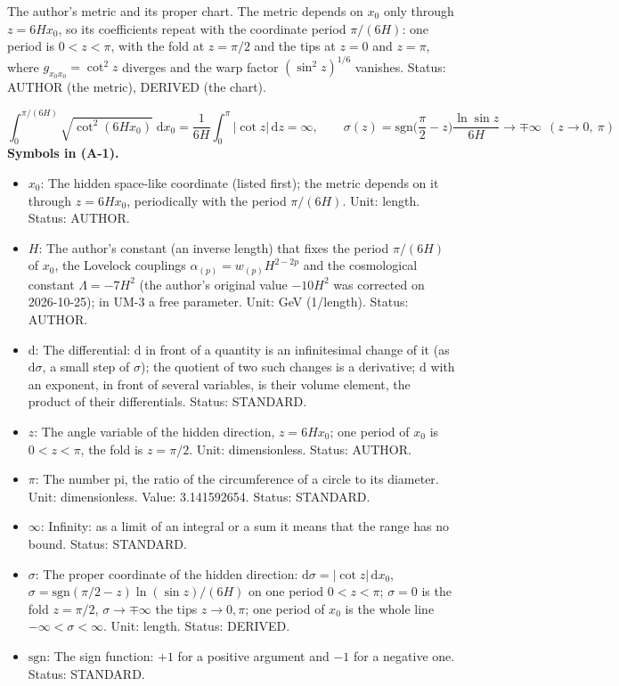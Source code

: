 \documentclass[
  10pt,
]{article}
\providecommand{\tightlist}{%
  \setlength{\itemsep}{0pt}\setlength{\parskip}{0pt}}
\begin{document}
The author's metric and its proper chart. The metric depends on \(x_0\)
only through \(z = 6Hx_0\), so its coefficients repeat with the
coordinate period \(\pi/(6H)\): one period is \(0 < z < \pi\), with the
fold at \(z = \pi/2\) and the tips at \(z = 0\) and \(z = \pi\), where
\(g_{x_0x_0} = \cot^2z\) diverges and the warp factor
\((\sin^2z)^{1/6}\) vanishes. Status: AUTHOR (the metric), DERIVED (the
chart).

\[
\int_0^{\pi/(6H)}\sqrt{\cot^2(6Hx_0)}\;\mathrm{d}x_0 = \frac{1}{6H}\int_0^{\pi}\lvert\cot z\rvert\,\mathrm{d}z = \infty,\qquad
\sigma(z) = \mathrm{sgn}\Big(\frac{\pi}{2} - z\Big)\frac{\ln\sin z}{6H} \to \mp\infty\ \ (z \to 0,\ \pi) \tag{A-1}
\] \textbf{Symbols in (A-1).}

\begin{itemize}
\tightlist
\item
  \(x_0\): The hidden space-like coordinate (listed first); the metric
  depends on it through \(z = 6Hx_0\), periodically with the period
  \(\pi/(6H)\). Unit: length. Status: AUTHOR.
\item
  \(H\): The author's constant (an inverse length) that fixes the period
  \(\pi/(6H)\) of \(x_0\), the Lovelock couplings
  \(\alpha_{(p)} = w_{(p)}H^{2-2p}\) and the cosmological constant
  \(\Lambda = -7H^2\) (the author's original value \(-10H^2\) was
  corrected on 2026-10-25); in UM-3 a free parameter. Unit: GeV
  (1/length). Status: AUTHOR.
\item
  \(\mathrm{d}\): The differential: \(\mathrm{d}\) in front of a
  quantity is an infinitesimal change of it (as \(\mathrm{d}\sigma\), a
  small step of \(\sigma\)); the quotient of two such changes is a
  derivative; \(\mathrm{d}\) with an exponent, in front of several
  variables, is their volume element, the product of their
  differentials. Status: STANDARD.
\item
  \(z\): The angle variable of the hidden direction, \(z = 6Hx_0\); one
  period of \(x_0\) is \(0 < z < \pi\), the fold is \(z = \pi/2\). Unit:
  dimensionless. Status: AUTHOR.
\item
  \(\pi\): The number pi, the ratio of the circumference of a circle to
  its diameter. Unit: dimensionless. Value: 3.141592654. Status:
  STANDARD.
\item
  \(\infty\): Infinity: as a limit of an integral or a sum it means that
  the range has no bound. Status: STANDARD.
\item
  \(\sigma\): The proper coordinate of the hidden direction:
  \(\mathrm{d}\sigma = \lvert\cot z\rvert\,\mathrm{d}x_0\),
  \(\sigma = \mathrm{sgn}(\pi/2 - z)\ln(\sin z)/(6H)\) on one period
  \(0 < z < \pi\); \(\sigma = 0\) is the fold \(z = \pi/2\),
  \(\sigma \to \mp\infty\) the tips \(z \to 0, \pi\); one period of
  \(x_0\) is the whole line \(-\infty < \sigma < \infty\). Unit: length.
  Status: DERIVED.
\item
  \(\mathrm{sgn}\): The sign function: \(+1\) for a positive argument
  and \(-1\) for a negative one. Status: STANDARD.
\end{itemize}
\end{document}
